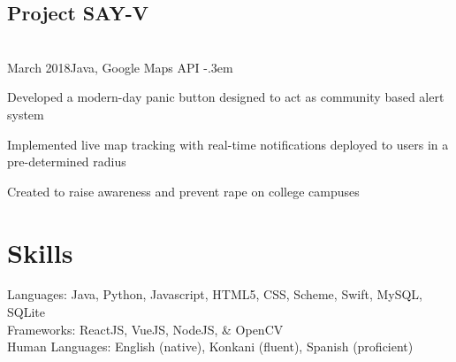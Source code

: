 \documentclass{article}
\let\olditemize=\itemize \let\endolditemize=\enditemize
\renewenvironment{itemize}{\olditemize[topsep=0em] \itemsep-.3em}{\endolditemize}
\newcommand{\entry}[3]{\quad\textbf{#1}\\#2\qquad#3}
\begin{document}
	\subsection{Project SAY-V}
	\entry{}{March 2018}{Java, Google Maps API}
	\begin{itemize}
		\item Developed a modern-day panic button designed to act as community based alert system
		\item Implemented live map tracking with real-time notifications deployed to users in a pre-determined radius
		\item Created to raise awareness and prevent rape on college campuses
	\end{itemize}
	
	\section{Skills}
	Languages:
	Java, Python, Javascript, HTML5, CSS, Scheme, Swift, MySQL, SQLite \\
	Frameworks:
	ReactJS, VueJS, NodeJS, \& OpenCV \\
	Human Languages:
	English (native), Konkani (fluent), Spanish (proficient)
	
	
\end{document}
